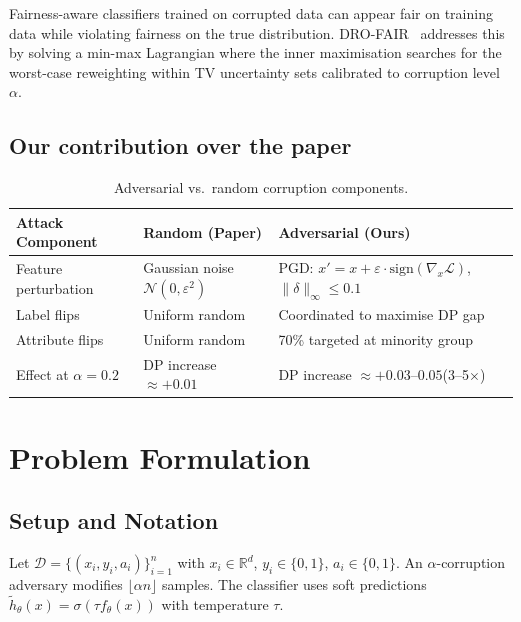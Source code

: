 \documentclass[11pt,a4paper]{article}
\newcommand{\R}{\mathbb{R}}
\newcommand{\htilde}{\tilde{h}}
\begin{document}
Fairness-aware classifiers trained on corrupted data can appear fair on
training data while violating fairness on the true distribution.
DRO-FAIR~\citep{drofair2026} addresses this by solving a min-max Lagrangian
where the inner maximisation searches for the worst-case reweighting within
TV uncertainty sets calibrated to corruption level $\alpha$.

\subsection*{Our contribution over the paper}

\begin{table}[h]
\centering\small
\caption{Adversarial vs.\ random corruption components.}
\label{tab:adversarial_compare}
\begin{tabular}{L{4cm}L{5cm}L{6cm}}
\toprule
{}
\color{white}\textbf{Attack Component} &
\color{white}\textbf{Random (Paper)} &
\color{white}\textbf{Adversarial (Ours)} \\
\midrule
Feature perturbation & Gaussian noise $\mathcal{N}(0,\varepsilon^2)$ &
  PGD: $x' = x + \varepsilon\cdot\mathrm{sign}(\nabla_x\mathcal{L})$,\; $\|\delta\|_\infty \le 0.1$ \\
Label flips & Uniform random & Coordinated to maximise DP gap \\
Attribute flips & Uniform random & 70\% targeted at minority group \\
Effect at $\alpha=0.2$ & DP increase $\approx+0.01$ & DP increase $\approx+0.03$--$0.05$\;(3--5$\times$) \\
\bottomrule
\end{tabular}
\end{table}

\section{Problem Formulation}

\subsection{Setup and Notation}

Let $\mathcal{D} = \{(x_i, y_i, a_i)\}_{i=1}^n$ with $x_i\in\R^d$,
$y_i\in\{0,1\}$, $a_i\in\{0,1\}$.  An $\alpha$-corruption adversary modifies
$\lfloor\alpha n\rfloor$ samples.  The classifier uses soft predictions
$\htilde_\theta(x) = \sigma(\tau f_\theta(x))$ with temperature $\tau$.
\end{document}
